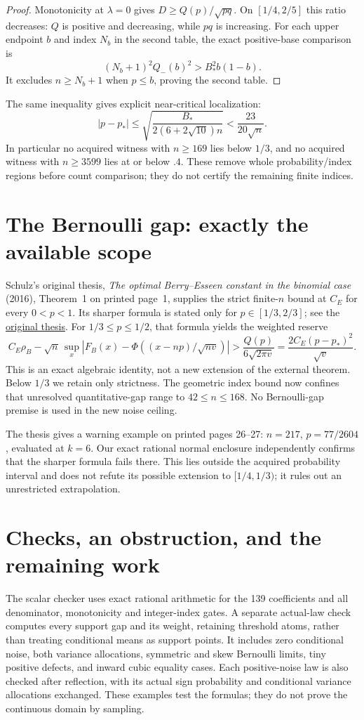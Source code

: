 \documentclass[11pt]{article}
\begin{document}
\begin{proof}
Monotonicity at $\lambda=0$ gives $D\ge Q(p)/\sqrt{pq}$.
On $[1/4,2/5]$ this ratio decreases: $Q$ is positive and decreasing,
while $pq$ is increasing. For each upper endpoint $b$ and index $N_b$
in the second table, the exact positive-base comparison is
\[
             (N_b+1)^2Q_-(b)^2>B_*^2b(1-b).
\]
It excludes $n\ge N_b+1$ when $p\le b$, proving the second table.
\end{proof}

The same inequality gives explicit near-critical localization:
\[
 |p-p_*|\le
 \sqrt{\frac{B_*}{2(6+2\sqrt{10})n}}
 <\frac{23}{20\sqrt n}.
\]
In particular no acquired witness with $n\ge169$ lies below $1/3$,
and no acquired witness with $n\ge3599$ lies at or below $.4$.
These remove whole probability/index regions before count comparison;
they do not certify the remaining finite indices.

\section{The Bernoulli gap: exactly the available scope}
Schulz's original thesis, \emph{The optimal Berry--Esseen constant in the
binomial case} (2016), Theorem~1 on printed page~1, supplies the strict
finite-$n$ bound at $C_E$ for every $0<p<1$. Its sharper formula is stated
only for $p\in[1/3,2/3]$; see the
\href{https://d-nb.info/1197702695/34}{original thesis}.
For $1/3\le p\le1/2$, that formula yields the weighted reserve
\[
 C_E\rho_B-\sqrt n\,\sup_x|F_B(x)-\Phi((x-np)/\sqrt{nv})|
 >\frac{Q(p)}{6\sqrt{2\pi v}}
   =\frac{2C_E(p-p_*)^2}{\sqrt v}.
\]
This is an exact algebraic identity, not a new extension of the external
theorem. Below $1/3$ we retain only strictness. The geometric index bound
now confines that unresolved quantitative-gap range to $42\le n\le168$.
No Bernoulli-gap premise is used in the new noise ceiling.

The thesis gives a warning example on printed pages 26--27:
$n=217$, $p=77/2604$, evaluated at $k=6$. Our exact rational normal
enclosure independently confirms that the sharper formula fails there.
This lies outside the acquired probability interval and does not refute
its possible extension to $[1/4,1/3)$; it rules out an unrestricted
extrapolation.

\section{Checks, an obstruction, and the remaining work}
The scalar checker uses exact rational arithmetic for the 139 coefficients
and all denominator, monotonicity and integer-index gates. A separate
actual-law check computes every support gap and its weight, retaining
threshold atoms, rather than treating conditional means as support points.
It includes zero conditional noise, both variance allocations, symmetric
and skew Bernoulli limits, tiny positive defects, and inward cubic equality
cases. Each positive-noise law is also checked after reflection, with its
actual sign probability and conditional variance allocations exchanged.
These examples test the formulas; they do not prove the continuous
domain by sampling.
\end{document}
